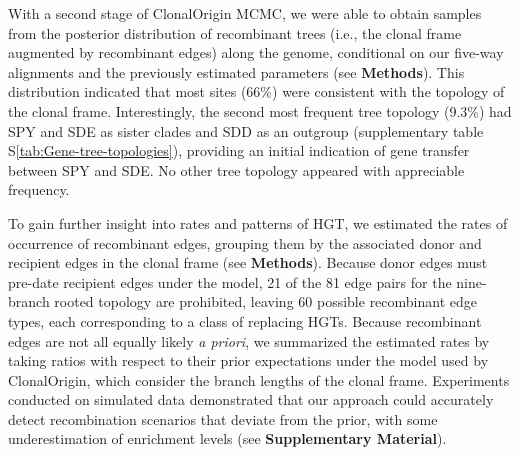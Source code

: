 \documentclass[12pt]{article}
\begin{document}
With a second stage of ClonalOrigin MCMC, we were able to obtain samples
from the posterior distribution of recombinant trees (i.e., the clonal
frame augmented by recombinant edges) along the genome, conditional on our
five-way alignments and the previously estimated parameters (see \textbf{Methods}).
This distribution indicated that most sites (66\%) were
consistent with the topology of the clonal frame.
Interestingly, the second most frequent tree topology (9.3\%) had
SPY and SDE as sister clades and SDD as an outgroup (supplementary table
S\ref{tab:Gene-tree-topologies}), providing an initial indication of gene
transfer between SPY and SDE.  No other tree topology appeared with
appreciable frequency.

To gain further insight into rates and patterns of HGT, we estimated the
rates of occurrence of recombinant edges, grouping them by the associated
donor and recipient edges in the clonal frame (see \textbf{Methods}).  Because donor
edges must pre-date recipient edges under the model, 21 of the 81 edge
pairs for the nine-branch rooted topology are prohibited, leaving 60
possible recombinant edge types, each corresponding to
a class of replacing HGTs.  
Because recombinant edges are not all equally likely \textit{a priori}, 
we summarized the estimated
rates by taking ratios with respect to their prior expectations under the
model used by ClonalOrigin, which consider the branch lengths of the clonal
frame.  Experiments conducted on simulated data demonstrated that our
approach could accurately detect recombination scenarios that deviate from
the prior, with some underestimation of enrichment levels 
(see \textbf{Supplementary Material}). 
\end{document}
